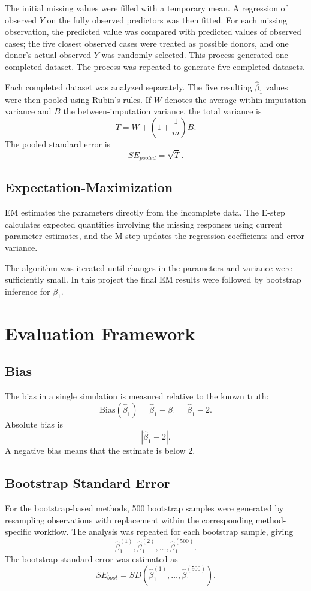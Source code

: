 \documentclass[11pt,a4paper]{article}
\begin{document}
The initial missing values were filled with a temporary mean. A regression of observed $Y$ on the fully observed predictors was then fitted. For each missing observation, the predicted value was compared with predicted values of observed cases; the five closest observed cases were treated as possible donors, and one donor's actual observed $Y$ was randomly selected. This process generated one completed dataset. The process was repeated to generate five completed datasets.

Each completed dataset was analyzed separately. The five resulting $\hat\beta_1$ values were then pooled using Rubin's rules. If $W$ denotes the average within-imputation variance and $B$ the between-imputation variance, the total variance is
\[
T=W+\left(1+\frac{1}{m}\right)B.
\]
The pooled standard error is
\[
SE_{pooled}=\sqrt{T}.
\]

\subsection{Expectation-Maximization}
EM estimates the parameters directly from the incomplete data. The E-step calculates expected quantities involving the missing responses using current parameter estimates, and the M-step updates the regression coefficients and error variance.

The algorithm was iterated until changes in the parameters and variance were sufficiently small. In this project the final EM results were followed by bootstrap inference for $\beta_1$.

\section{Evaluation Framework}
\subsection{Bias}
The bias in a single simulation is measured relative to the known truth:
\[
\text{Bias}(\hat\beta_1)=\hat\beta_1-\beta_1=\hat\beta_1-2.
\]
Absolute bias is
\[
|\hat\beta_1-2|.
\]
A negative bias means that the estimate is below 2.

\subsection{Bootstrap Standard Error}
For the bootstrap-based methods, 500 bootstrap samples were generated by resampling observations with replacement within the corresponding method-specific workflow. The analysis was repeated for each bootstrap sample, giving
\[
\hat\beta_1^{(1)},\hat\beta_1^{(2)},\ldots,\hat\beta_1^{(500)}.
\]
The bootstrap standard error was estimated as
\[
SE_{boot}=SD\left(\hat\beta_1^{(1)},\ldots,\hat\beta_1^{(500)}\right).
\]
\end{document}
